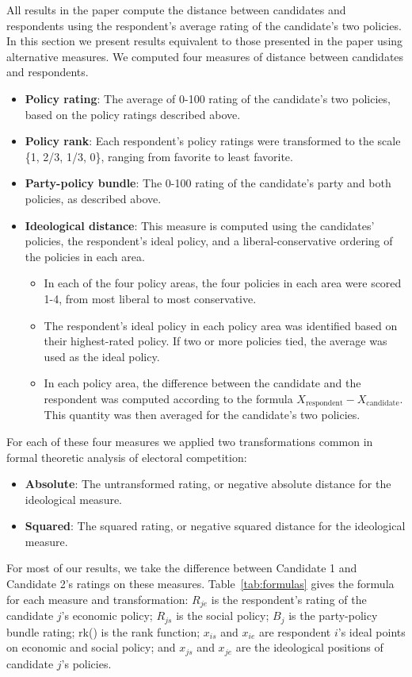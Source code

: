 \documentclass[12pt]{article}
\begin{document}
All results in the paper compute the distance between candidates and respondents using the respondent's average rating of the candidate's two policies. In this section we present results equivalent to those presented in the paper using alternative measures. We computed four measures of distance between candidates and respondents.
\begin{itemize}
\item \textbf{Policy rating}: The average of 0-100 rating of the candidate's two policies, based on the policy ratings described above.
\item \textbf{Policy rank}: Each respondent's policy ratings were transformed to the scale \{1, 2/3, 1/3, 0\}, ranging from favorite to least favorite.
\item \textbf{Party-policy bundle}: The 0-100 rating of the candidate's party and both policies, as described above.
\item \textbf{Ideological distance}: This measure is computed using the candidates' policies, the respondent's ideal policy, and a liberal-conservative ordering of the policies in each area.
\begin{itemize}
\item In each of the four policy areas, the four policies in each area were scored 1-4, from most liberal to most conservative.
\item The respondent's ideal policy in each policy area was identified based on their highest-rated policy. If two or more policies tied, the average was used as the ideal policy.
\item In each policy area, the difference between the candidate and the respondent was computed according to the formula $X_\text{respondent} - X_\text{candidate}$. This quantity was then averaged for the candidate's two policies.
\end{itemize}
\end{itemize}
For each of these four measures we applied two transformations common in formal theoretic analysis of electoral competition:
\begin{itemize}
\item \textbf{Absolute}: The untransformed rating, or negative absolute distance for the ideological measure.
\item \textbf{Squared}: The squared rating, or negative squared distance for the ideological measure.
\end{itemize}

For most of our results, we take the difference between Candidate 1 and Candidate 2's ratings on these measures. Table~\ref{tab:formulas} gives the formula for each measure and transformation: $R_{je}$ is the respondent's rating of the candidate $j$'s economic policy; $R_{js}$ is the social policy; $B_j$ is the party-policy bundle rating; rk() is the rank function; $x_{is}$ and $x_{ie}$ are respondent $i$'s ideal points on economic and social policy; and $x_{js}$ and $x_{je}$ are the ideological positions of candidate $j$'s policies.
\end{document}
